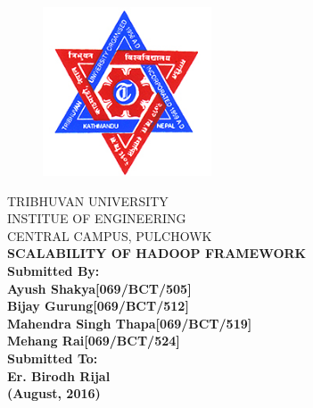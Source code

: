 \newpage
{}
\begin{figure}[t]
        \centering
        \includegraphics[width=50mm]{tu-logo.jpg}
\end{figure}
\begin{nscenter}
        TRIBHUVAN UNIVERSITY\\ 
        INSTITUE OF ENGINEERING\\
        CENTRAL CAMPUS, PULCHOWK\\
        \vspace{21mm}
        \bfseries{
                SCALABILITY OF HADOOP FRAMEWORK\\
        }
        \vspace{18mm}
        \textbf {Submitted By:}\\
        \textnormal{
                Ayush Shakya\hspace{25mm}[069/BCT/505]\\
                Bijay Gurung\hspace{25mm}[069/BCT/512]\\
                Mahendra Singh Thapa\hspace{9mm}[069/BCT/519]\\
                Mehang Rai\hspace{28mm}[069/BCT/524]\\
        } 
        \vspace{18mm}
        \textbf{Submitted To:}\\
        \textnormal{
                Er. Birodh Rijal\\
        }
        \vspace{24mm}
                (August, 2016)
\end{nscenter}
